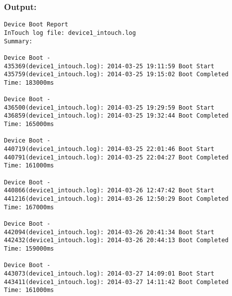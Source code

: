 \documentclass[12pt]{article}
\begin{document}
\subsubsection{Output:}
\begin{lstlisting}[style=cppcode]
Device Boot Report
InTouch log file: device1_intouch.log
Summary:

Device Boot - 
435369(device1_intouch.log): 2014-03-25 19:11:59 Boot Start
435759(device1_intouch.log): 2014-03-25 19:15:02 Boot Completed	   Time: 183000ms

Device Boot - 
436500(device1_intouch.log): 2014-03-25 19:29:59 Boot Start
436859(device1_intouch.log): 2014-03-25 19:32:44 Boot Completed	   Time: 165000ms

Device Boot - 
440719(device1_intouch.log): 2014-03-25 22:01:46 Boot Start
440791(device1_intouch.log): 2014-03-25 22:04:27 Boot Completed	   Time: 161000ms

Device Boot - 
440866(device1_intouch.log): 2014-03-26 12:47:42 Boot Start
441216(device1_intouch.log): 2014-03-26 12:50:29 Boot Completed	   Time: 167000ms

Device Boot - 
442094(device1_intouch.log): 2014-03-26 20:41:34 Boot Start
442432(device1_intouch.log): 2014-03-26 20:44:13 Boot Completed	   Time: 159000ms

Device Boot - 
443073(device1_intouch.log): 2014-03-27 14:09:01 Boot Start
443411(device1_intouch.log): 2014-03-27 14:11:42 Boot Completed	   Time: 161000ms

\end{lstlisting}
\end{document}
